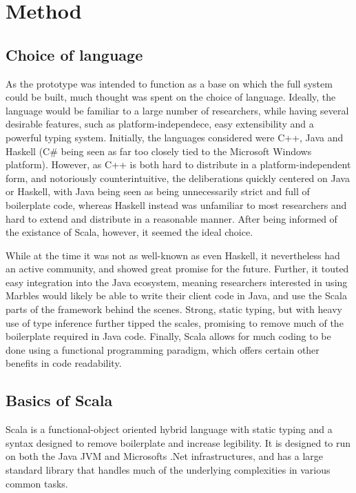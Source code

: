 \section{Method}

\subsection{Choice of language}

As the prototype was intended to function as a base on which the full
system could be built, much thought was spent on the choice of language.
Ideally, the language would be familiar to a large number of researchers,
while having several desirable features, such as platform-independece, easy
extensibility and a powerful typing system. Initially, the languages
considered were C++, Java and Haskell (C# being seen as far too closely
tied to the Microsoft Windows platform). However, as C++ is both hard to
distribute in a platform-independent form, and notoriously
counterintuitive, the deliberations quickly centered on Java or Haskell,
with Java being seen as being unnecessarily strict and full of boilerplate
code, whereas Haskell instead was unfamiliar to most researchers and hard
to extend and distribute in a reasonable manner. After being informed of
the existance of Scala, however, it seemed the ideal choice.

While at the time it was not as well-known as even Haskell, it nevertheless
had an active community, and showed great promise for the future. Further,
it touted easy integration into the Java ecosystem, meaning researchers
interested in using Marbles would likely be able to write their client code
in Java, and use the Scala parts of the framework behind the scenes.
Strong, static typing, but with heavy use of type inference further tipped
the scales, promising to remove much of the boilerplate required in Java
code. Finally, Scala allows for much coding to be done using a functional
programming paradigm, which offers certain other benefits in code
readability.


\subsection{Basics of Scala}

Scala is a functional-object oriented hybrid language with static typing
and a syntax designed to remove boilerplate and increase legibility. It is
designed to run on both the Java JVM and Microsofts .Net infrastructures,
and has a large standard library that handles much of the underlying
complexities in various common tasks. 

